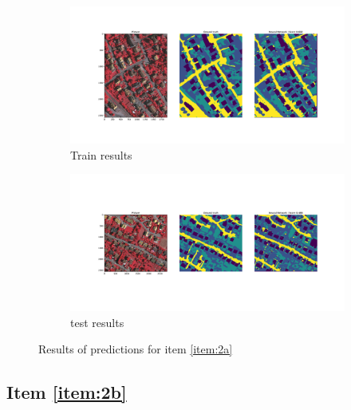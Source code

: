 \documentclass[10pt, a4paper]{article}
\begin{document}
\begin{figure}[htpb]
  \centering
  \begin{subfigure}[b]{1.0\textwidth}
      \centering
      \includegraphics[width=\textwidth]{images/Patch32_scratch_train.pdf}
      \caption{Train results}
      \label{fig:q2a_train}
  \end{subfigure}
  \hfill
  \begin{subfigure}[b]{1.0\textwidth}
    \centering
    \includegraphics[width=\textwidth]{images/Patch32_scratch_test.pdf}
    \caption{test results}
    \label{fig:q2a_test}
  \end{subfigure}
  \caption{Results of predictions for item \ref{item:2a}}
  \label{fig:q2a_results}
\end{figure}

\subsection{Item \ref{item:2b}}

\lipsum[1]
\end{document}
